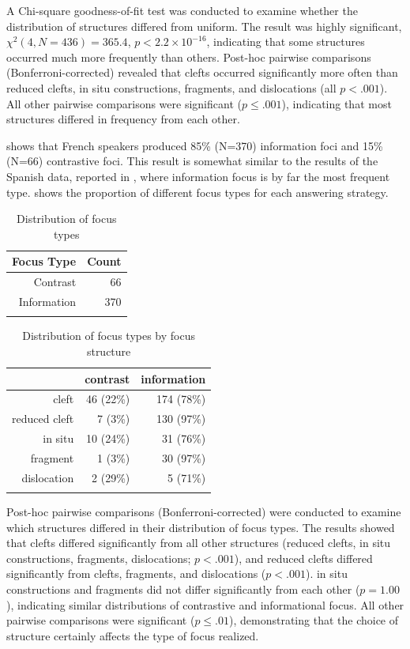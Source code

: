 {A Chi-square goodness-of-fit test was conducted to examine whether the distribution of structures differed from uniform. The result was highly significant, $\chi^2(4, N = 436) = 365.4$, $p < 2.2 \times 10^{-16}$, indicating that some structures occurred much more frequently than others.%
Post-hoc pairwise comparisons (Bonferroni-corrected) revealed that clefts occurred significantly more often than reduced clefts, in situ constructions, fragments, and dislocations (all $p < .001$). All other pairwise comparisons were significant ($p \leq .001$), indicating that most structures differed in frequency from each other.

 shows that French speakers produced 85\% (N=370) information foci and 15\% (N=66) contrastive foci. This result is somewhat similar to the results of the Spanish data, reported in , where information focus is by far the most frequent type.  shows the proportion of different focus types for each answering strategy.

\begin{table}[ht]
\centering
\begin{tabular}{rr}
  \lsptoprule
Focus Type & Count \\ 
  \midrule
 {Contrast} &  66 \\
 {Information} & 370 \\
   \lspbottomrule
\end{tabular}
\caption{Distribution of focus types}
\label{tab:4.4}
\end{table}

\begin{table}[ht]
\centering
\begin{tabular}{rrr}
  \lsptoprule
 & contrast & information \\ 
  \midrule
cleft &  46 (22\%) & 174 (78\%) \\ 
  reduced cleft &   7 (3\%) & 130 (97\%)\\ 
  in situ &  10 (24\%) &  31 (76\%) \\ 
  fragment &   1 (3\%) &  30 (97\%)\\ 
  dislocation &   2 (29\%) &   5 (71\%) \\ 
   \lspbottomrule
\end{tabular}
\caption{Distribution of focus types by focus structure}
\label{tab:4.5}
\end{table}

Post-hoc pairwise comparisons (Bonferroni-corrected) were conducted to examine which structures differed in their distribution of focus types. The results showed that clefts differed significantly from all other structures (reduced clefts, in situ constructions, fragments, dislocations; $p < .001$), and reduced clefts differed significantly from clefts, fragments, and dislocations ($p < .001$). in situ constructions and fragments did not differ significantly from each other ($p = 1.00$), indicating similar distributions of contrastive and informational focus. All other pairwise comparisons were significant ($p \leq .01$), demonstrating that the choice of structure certainly affects the type of focus realized.


}
